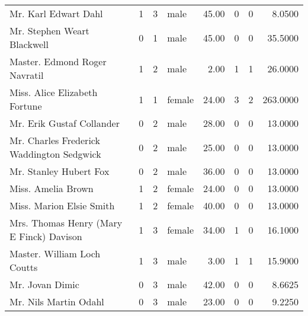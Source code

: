\begin{tabular}{lrrlrrrr}
Mr. Karl Edwart Dahl                               &         1 &       3 &    male &  45.00 &                        0 &                        0 &    8.0500 \\
Mr. Stephen Weart Blackwell                        &         0 &       1 &    male &  45.00 &                        0 &                        0 &   35.5000 \\
Master. Edmond Roger Navratil                      &         1 &       2 &    male &   2.00 &                        1 &                        1 &   26.0000 \\
Miss. Alice Elizabeth Fortune                      &         1 &       1 &  female &  24.00 &                        3 &                        2 &  263.0000 \\
Mr. Erik Gustaf Collander                          &         0 &       2 &    male &  28.00 &                        0 &                        0 &   13.0000 \\
Mr. Charles Frederick Waddington Sedgwick          &         0 &       2 &    male &  25.00 &                        0 &                        0 &   13.0000 \\
Mr. Stanley Hubert Fox                             &         0 &       2 &    male &  36.00 &                        0 &                        0 &   13.0000 \\
Miss. Amelia Brown                                 &         1 &       2 &  female &  24.00 &                        0 &                        0 &   13.0000 \\
Miss. Marion Elsie Smith                           &         1 &       2 &  female &  40.00 &                        0 &                        0 &   13.0000 \\
Mrs. Thomas Henry (Mary E Finck) Davison           &         1 &       3 &  female &  34.00 &                        1 &                        0 &   16.1000 \\
Master. William Loch Coutts                        &         1 &       3 &    male &   3.00 &                        1 &                        1 &   15.9000 \\
Mr. Jovan Dimic                                    &         0 &       3 &    male &  42.00 &                        0 &                        0 &    8.6625 \\
Mr. Nils Martin Odahl                              &         0 &       3 &    male &  23.00 &                        0 &                        0 &    9.2250 \\

\end{tabular}
